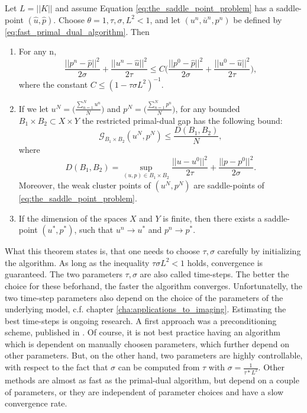     \begin{theorem} %
    \label{the:primal_dual_convergence}
        Let $L = ||K||$ and assume Equation \ref{eq:the_saddle_point_problem} has a saddle-point $(\hat{u}, \hat{p})$. Choose $\theta = 1, \tau, \sigma, L^{2} < 1$, and let $(u^{n}, \bar{u}^{n}, p^{n})$ be defined by \ref{eq:fast_primal_dual_algorithm}. Then
            \begin{enumerate}
                \item For any n,
                    $$
                        \frac{||p^{n} - \hat{p}||^{2}}{2\sigma} + \frac{||u^{n} - \hat{u}||^{2}}{2\tau} \le C \bigg( \frac{||p^{0} - \hat{p}||^{2}}{2\sigma} + \frac{||u^{0} - \hat{u}||^{2}}{2\tau} \bigg),
                    $$
                where the constant $C \le (1 - \tau\sigma L^{2})^{-1}$.
                \item If we let $u^{N} = \bigg( \frac{\sum\limits_{n=1}^{N} u^{n}}{N} \bigg)$ and $p^{N} = \bigg( \frac{\sum\limits_{n=1}^{N} p^{n}}{N} \bigg)$, for any bounded $B_{1} \times B_{2} \subset X \times Y$ the restricted primal-dual gap has the following bound:
                    $$
                        \mathcal{G}_{B_{1} \times B_{2}}(u^{N}, p^{N}) \le \frac{D(B_{1}, B_{2})}{N},
                    $$
                where
                    $$
                        D(B_{1}, B_{2}) = \sup_{(u, p) \in B_{1} \times B_{2}} \frac{||u - u^{0}||^{2}}{2\tau} + \frac{||p - p^{0}||^{2}}{2\sigma}.
                    $$
                Moreover, the weak cluster points of $(u^{N}, p^{N})$ are saddle-points of \ref{eq:the_saddle_point_problem}.
                \item If the dimension of the spaces $X$ and $Y$ is finite, then there exists a saddle-point $(u^{\ast}, p^{\ast})$, such that $u^{n} \longrightarrow u^{\ast}$ and $p^{n} \longrightarrow p^{\ast}$.
            \end{enumerate}
    \end{theorem}

    \begin{remark}
        What this theorem states is, that one needs to choose $\tau, \sigma$ carefully by initializing the algorithm. As long as the inequality $\tau\sigma L^{2} < 1$ holds, convergence is guaranteed. The two parameters $\tau, \sigma$ are also called time-steps. The better the choice for these beforhand, the faster the algorithm converges. Unfortunatelly, the two time-step parameters also depend on the choice of the parameters of the underlying model, c.f. chapter \ref{cha:applications_to_imaging}. Estimating the best time-steps is ongoing research. A first approach was a preconditioning scheme, published in \cite{Pock2011}. Of course, it is not best practice having an algorithm which is dependent on manually choosen parameters, which further depend on other parameters. But, on the other hand, two parameters are highly controllable, with respect to the fact that $\sigma$ can be computed from $\tau$ with $\sigma = \frac{1}{\tau * L^{2}}$. Other methods are almost as fast as the primal-dual algorithm, but depend on a couple of parameters, or they are independent of parameter choices and have a slow convergence rate.
    \end{remark}

